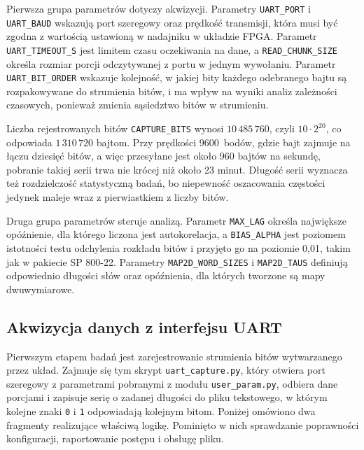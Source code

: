 Pierwsza grupa parametrów dotyczy akwizycji. Parametry \texttt{UART\_PORT}
i \texttt{UART\_BAUD} wskazują port szeregowy oraz prędkość transmisji, która
musi być zgodna z wartością ustawioną w nadajniku w układzie FPGA.
Parametr \texttt{UART\_TIMEOUT\_S} jest limitem czasu oczekiwania na dane,
a \texttt{READ\_CHUNK\_SIZE} określa rozmiar porcji odczytywanej z portu
w jednym wywołaniu. Parametr \texttt{UART\_BIT\_ORDER} wskazuje kolejność, w jakiej
bity każdego odebranego bajtu są rozpakowywane do strumienia bitów, i ma wpływ na
wyniki analiz zależności czasowych, ponieważ zmienia sąsiedztwo bitów w strumieniu.

Liczba rejestrowanych bitów \texttt{CAPTURE\_BITS} wynosi $10\,485\,760$,
czyli $10\cdot 2^{20}$, co odpowiada $1\,310\,720$ bajtom. Przy prędkości
9600~bodów, gdzie bajt zajmuje na łączu dziesięć bitów, a więc przesyłane jest
około 960 bajtów na sekundę, pobranie takiej serii trwa nie krócej niż około
23 minut. Długość serii wyznacza też rozdzielczość statystyczną badań, bo
niepewność oszacowania częstości jedynek maleje wraz z pierwiastkiem z liczby
bitów.

Druga grupa parametrów steruje analizą. Parametr \texttt{MAX\_LAG} określa
największe opóźnienie, dla którego liczona jest autokorelacja,
a \texttt{BIAS\_ALPHA} jest poziomem istotności testu odchylenia rozkładu bitów
i przyjęto go na poziomie 0,01, takim jak w pakiecie SP 800-22. Parametry
\texttt{MAP2D\_WORD\_SIZES} i \texttt{MAP2D\_TAUS} definiują odpowiednio długości
słów oraz opóźnienia, dla których tworzone są mapy dwuwymiarowe.

\subsection{Akwizycja danych z interfejsu UART}

Pierwszym etapem badań jest zarejestrowanie strumienia bitów wytwarzanego
przez układ. Zajmuje się tym skrypt \texttt{uart\_capture.py}, który otwiera
port szeregowy z parametrami pobranymi z modułu \texttt{user\_param.py},
odbiera dane porcjami i zapisuje serię o zadanej długości do pliku tekstowego,
w którym kolejne znaki \texttt{0} i \texttt{1} odpowiadają kolejnym bitom.
Poniżej omówiono dwa fragmenty realizujące właściwą logikę. Pominięto
w nich sprawdzanie poprawności konfiguracji, raportowanie postępu i obsługę
pliku.



